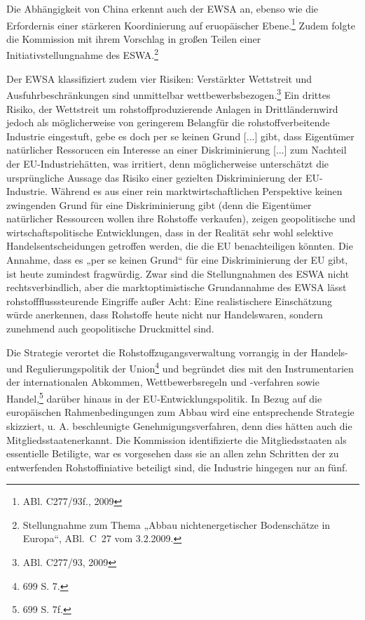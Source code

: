 \documentclass[12pt,a4paper,oneside]{book} %
\begin{document}
 Die Abhängigkeit von China erkennt auch der EWSA an, ebenso wie die Erfordernis einer stärkeren Koordinierung auf eruopäischer Ebene.\footnote{ABl. C277/93f., 2009} Zudem folgte die Kommission mit ihrem Vorschlag in großen Teilen einer Initiativstellungnahme des ESWA.\footnote{Stellungnahme zum Thema „Abbau nichtenergetischer Bodenschätze in Europa“, ABl. C 27 vom 3.2.2009.}

Der EWSA klassifiziert zudem vier Risiken: Verstärkter Wettstreit und Ausfuhrbeschränkungen sind unmittelbar wettbewerbsbezogen.\footnote{ABl. C277/93, 2009} Ein drittes Risiko, der \glqq Wettstreit um rohstoffproduzierende Anlagen in Drittländern\grqq wird jedoch als \glqq möglicherweise von geringerem Belang\grqq für die rohstoffverbeitende Industrie eingestuft, gebe es doch \glqq per se keinen Grund [...] gibt, dass Eigentümer natürlicher Ressorucen ein Interesse an einer Diskriminierung [...] zum Nachteil der EU-Industrie\grqq hätten, was irritiert, denn möglicherweise unterschätzt die ursprüngliche Aussage das Risiko einer gezielten Diskriminierung der EU-Industrie. Während es aus einer rein marktwirtschaftlichen Perspektive keinen zwingenden Grund für eine Diskriminierung gibt (denn die Eigentümer natürlicher Ressourcen wollen ihre Rohstoffe verkaufen), zeigen geopolitische und wirtschaftspolitische Entwicklungen, dass in der Realität sehr wohl selektive Handelsentscheidungen getroffen werden, die die EU benachteiligen könnten. Die Annahme, dass es „per se keinen Grund“ für eine Diskriminierung der EU gibt, ist heute zumindest fragwürdig. Zwar sind die Stellungnahmen des ESWA nicht rechtsverbindlich, aber die marktoptimistische Grundannahme des EWSA lässt rohstoffflusssteurende Eingriffe außer Acht:  Eine realistischere Einschätzung würde anerkennen, dass Rohstoffe heute nicht nur Handelswaren, sondern zunehmend auch geopolitische Druckmittel sind.


Die Strategie verortet die Rohstoffzugangsverwaltung vorrangig in der Handels- und Regulierungspolitik der Union\footnote{699 S. 7.} und begründet dies mit den Instrumentarien der internationalen Abkommen, Wettbewerbsregeln und -verfahren sowie Handel,\footnote{699 S. 7f.} darüber hinaus in der EU-Entwicklungspolitik. In Bezug auf die europäischen Rahmenbedingungen zum Abbau wird eine entsprechende Strategie skizziert, u. A. beschleunigte Genehmigungsverfahren, denn dies hätten \glqq auch die Mitgliedsstaaten\grqq erkannt. Die Kommission identifizierte die Mitgliedsstaaten als essentielle Betiligte, war es vorgesehen dass sie an allen zehn Schritten der zu entwerfenden Rohstoffiniative beteiligt sind, die Industrie hingegen nur an fünf.
\end{document}
